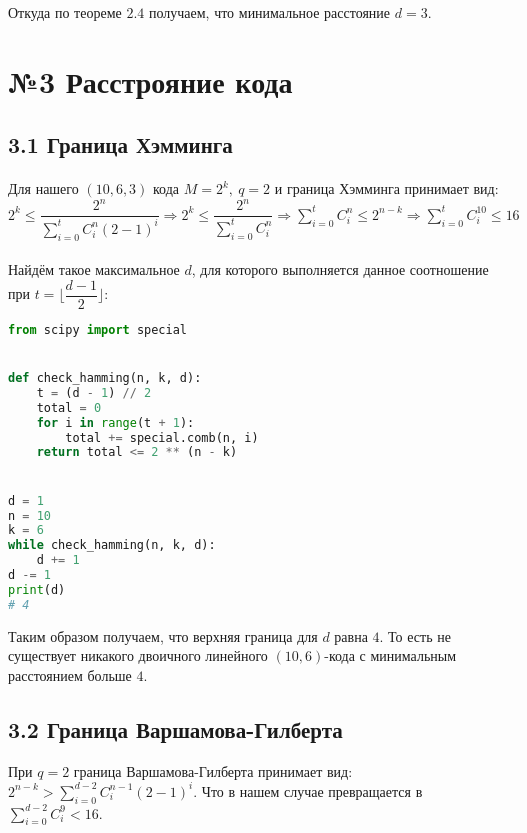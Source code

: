 \documentclass[fontsize=14pt]{article}
\begin{document}
Откуда по теореме $2.4$ получаем, что минимальное расстояние $d = 3$.

\section*{№3 Расстрояние кода}

\subsection*{3.1 Граница Хэмминга}

\paragraph*{}
Для нашего $(10, 6, 3)$ кода $M = 2^k,\ q = 2$ и граница Хэмминга принимает вид: $2^k \leq \dfrac{2^n}{\sum\limits_{i = 0}^t C_i^n \left(2 - 1
\right) ^ i} 
\Rightarrow 
2^k \leq \dfrac{2^n}{\sum\limits_{i = 0}^t C_i^n}
\Rightarrow
\sum\limits_{i = 0}^t C_i^n \leq 2^{n - k}
\Rightarrow
\sum\limits_{i = 0}^t C_i^{10} \leq 16
$

\paragraph*{}
Найдём такое максимальное $d$, для которого выполняется данное соотношение при $t = \lfloor \dfrac{d - 1}{2} \rfloor$:

\begin{lstlisting}[frame=single, language=Python]
from scipy import special


def check_hamming(n, k, d):
    t = (d - 1) // 2
    total = 0
    for i in range(t + 1):
        total += special.comb(n, i)
    return total <= 2 ** (n - k)


d = 1
n = 10
k = 6
while check_hamming(n, k, d):
    d += 1
d -= 1
print(d)
# 4	
\end{lstlisting}

Таким образом получаем, что верхняя граница для $d$ равна $4$. То есть не существует никакого двоичного линейного $(10, 6)$-кода с минимальным расстоянием больше $4$.

\subsection*{3.2 Граница Варшамова-Гилберта}

При $q = 2$ граница Варшамова-Гилберта принимает вид: $2^{n - k} > \sum\limits_{i = 0}^{d - 2} C_i^{n - 1}(2 - 1)^i$. Что в нашем случае превращается в $\sum\limits_{i = 0}^{d - 2} C_i^9 < 16$.
 
\end{document}
